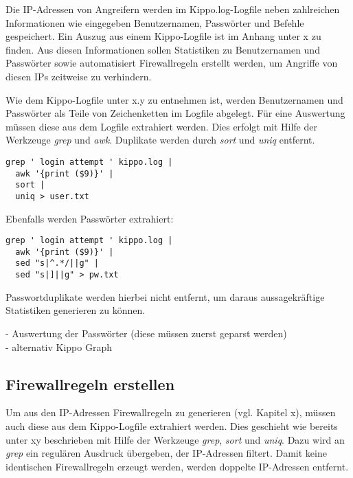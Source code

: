 Die IP-Adressen von Angreifern werden im Kippo.log-Logfile neben zahlreichen Informationen wie eingegeben Benutzernamen, Passwörter und Befehle gespeichert. Ein Auszug aus einem Kippo-Logfile ist im Anhang unter x zu finden. Aus diesen Informationen sollen Statistiken zu Benutzernamen und Passwörter sowie automatisiert Firewallregeln erstellt werden, um Angriffe von diesen IPs zeitweise zu verhindern.

Wie dem Kippo-Logfile unter x.y zu entnehmen ist, werden Benutzernamen und Passwörter als Teile von Zeichenketten im Logfile abgelegt. Für eine Auswertung müssen diese aus dem Logfile extrahiert werden. Dies erfolgt mit Hilfe der Werkzeuge \textit{grep} und \textit{awk}. Duplikate werden durch \textit{sort} und \textit{uniq} entfernt.



\begin{lstlisting}[style=customc]
grep ' login attempt ' kippo.log |
  awk '{print ($9)}' |
  sort |
  uniq > user.txt
\end{lstlisting}

Ebenfalls werden Passwörter extrahiert:

\begin{lstlisting}[style=customc]
grep ' login attempt ' kippo.log |
  awk '{print ($9)}' |
  sed "s|^.*/||g" |
  sed "s|]||g" > pw.txt
\end{lstlisting}

Passwortduplikate werden hierbei nicht entfernt, um daraus aussagekräftige Statistiken generieren zu können.


- Auswertung der Passwörter (diese müssen zuerst geparst werden)\\
- alternativ Kippo Graph

\subsection{Firewallregeln erstellen}
\label{subsec:Firewallregeln erstellen}

Um aus den IP-Adressen Firewallregeln zu generieren (vgl. Kapitel x), müssen auch diese aus dem Kippo-Logfile extrahiert werden. Dies geschieht wie bereits unter xy beschrieben mit Hilfe der Werkzeuge \textit{grep}, \textit{sort} und \textit{uniq}. Dazu wird an \textit{grep} ein regulären Ausdruck übergeben, der IP-Adressen filtert. Damit keine identischen Firewallregeln erzeugt werden, werden doppelte IP-Adressen entfernt.

